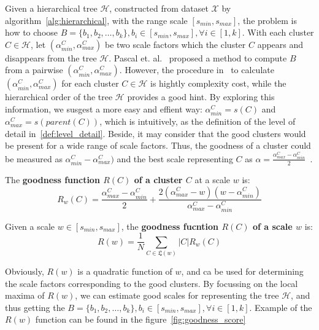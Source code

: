 Given a hierarchical tree $\mathcal{H}$, constructed from dataset $\mathcal{X}$ by algorithm~\ref{alg:hierarchical}, with the range scale $[s_{min},s_{max}]$, the problem is how to choose $\mathsf{\textit{B}} = \{b_1, b_2, \ldots, b_k\}, b_i \in [s_{min},s_{max}], \forall i \in [1,k]$. With each cluster $C \in \mathcal{H}$, let $(\alpha_{min}^C,\alpha_{max}^C)$ be two scale factors which the cluster $C$ appears and disappears from the tree $\mathcal{H}$. Pascal et. al.~\cite{pons2011postprocessing} proposed a method to compute $\mathsf{\textit{B}}$ from a pairwise $(\alpha_{min}^C,\alpha_{max}^C)$. However, the procedure in~\cite{pons2011postprocessing} to calculate $(\alpha_{min}^C,\alpha_{max}^C)$ for each cluster $C \in \mathcal{H}$ is hightly complexity cost, while the hierarchical order of the tree $\mathcal{H}$ provides a good hint. By exploring this information, we susgest a more easy and effient way: $\alpha_{min}^C = s(C)$ and $\alpha_{max}^C = s(parent(C))$, which is intuitively, as the definition of the level of detail in~\ref{def:level_detail}. Beside, it may consider that the good clusters would be present for a wide range of scale factors. Thus, the goodness of a cluster could be measured as $\alpha_{min}^C - \alpha_{max}^C)$ and the best scale representing $C$ as $\alpha = \frac{\alpha_{max}^C-\alpha_{min}^C}{2}$~\cite{pons2011postprocessing}.
\begin{definition}
\label{def:goodness_cluster} The \textbf{goodness function $R(C)$ of a cluster $C$} at a scale $w$ is:
\begin{equation}
\label{equ:goodness_cluster}
R_{w}(C) = \frac{\alpha_{max}^C-\alpha_{min}^C}{2} + \frac{2(\alpha_{max}^C- w)(w - \alpha_{min}^C)}{\alpha_{max}^C-\alpha_{min}^C}
\end{equation}
\end{definition}
\begin{definition}
\label{def:goodness_scale} Given a scale $w \in [s_{min},s_{max}]$, the \textbf{goodness fucntion $R(C)$ of a scale $w$} is:
\begin{equation}
\label{equ:goodness_scale}
R(w) = \frac{1}{N}\sum_{C \in \mathfrak{L}(w)} |C|R_{w}(C)
\end{equation}
\end{definition}
Obviously, $R(w)$ is a quadratic function of $w$, and ca be used for determining the scale factors corresponding to the good clusters. By focussing on the local maxima of $R(w)$, we can estimate good scales for representing the tree $\mathcal{H}$, and thus getting the $\mathsf{\textit{B}} = \{b_1, b_2, \ldots, b_k\}, b_i \in [s_{min},s_{max}], \forall i \in [1,k]$. Example of the $R(w)$ function can be found in the figure~\ref{fig:goodness_score}

